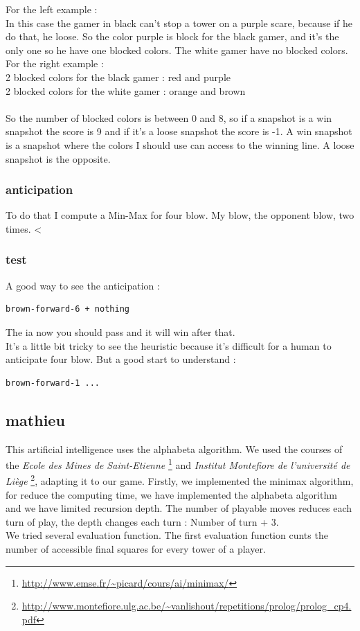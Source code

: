 \documentclass[a4paper, 11pt]{article}
\begin{document}
For the left example :\\
In this case the gamer in black can't stop a tower on a purple scare, because if he do that, he loose. So the color purple is block for the black gamer, and it's the only one so he have one blocked colors. The white gamer have no blocked colors.\\
For the right example :\\
2 blocked colors for the black gamer : red and purple\\
2 blocked colors for the white gamer : orange and brown\\\\
So the number of blocked colors is between 0 and 8, so if a snapshot is a win snapshot the score is 9 and if it's a loose snapshot the score is -1. A win snapshot is a snapshot where the colors I should use can access to the winning line. A loose snapshot is the opposite.

\subsubsection{anticipation}
To do that I compute a Min-Max for four blow. My blow, the opponent blow, two times.
<
\subsubsection{test}
A good way to see the anticipation :
\begin{verbatim}
brown-forward-6 + nothing
\end{verbatim}
The ia now you should pass and it will win after that.\\

It's a little bit tricky to see the heuristic because it's difficult for a human to anticipate four blow. But a good start to understand :
\begin{verbatim}
brown-forward-1 ...
\end{verbatim}

\subsection{mathieu}
This artificial intelligence uses the alphabeta algorithm. We used the courses of the \emph{Ecole des Mines de Saint-Etienne} \footnote{\url{http://www.emse.fr/~picard/cours/ai/minimax/}} and \emph{Institut Montefiore de l'université de Liège} \footnote{\url{http://www.montefiore.ulg.ac.be/~vanlishout/repetitions/prolog/prolog_cp4.pdf}}, adapting it to our game. Firstly, we implemented the minimax algorithm, for reduce the computing time, we have implemented the alphabeta algorithm and we have limited recursion depth. The number of playable moves reduces each turn of play, the depth changes each turn : Number of turn + 3. \\
We tried several evaluation function.
The first evaluation function cunts the number of accessible final squares for every tower of a player. 
\end{document}
